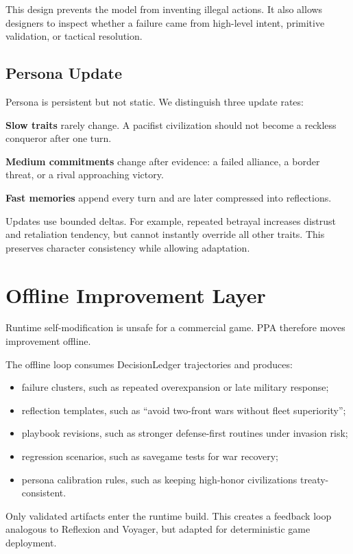 \documentclass[10pt,twocolumn]{article}
\begin{document}
This design prevents the model from inventing illegal actions. It also allows designers to inspect whether a failure came from high-level intent, primitive validation, or tactical resolution.

\subsection{Persona Update}
Persona is persistent but not static. We distinguish three update rates:

\textbf{Slow traits} rarely change. A pacifist civilization should not become a reckless conqueror after one turn.

\textbf{Medium commitments} change after evidence: a failed alliance, a border threat, or a rival approaching victory.

\textbf{Fast memories} append every turn and are later compressed into reflections.

Updates use bounded deltas. For example, repeated betrayal increases distrust and retaliation tendency, but cannot instantly override all other traits. This preserves character consistency while allowing adaptation.

\section{Offline Improvement Layer}
Runtime self-modification is unsafe for a commercial game. PPA therefore moves improvement offline.

The offline loop consumes DecisionLedger trajectories and produces:
\begin{itemize}
  \item failure clusters, such as repeated overexpansion or late military response;
  \item reflection templates, such as ``avoid two-front wars without fleet superiority'';
  \item playbook revisions, such as stronger defense-first routines under invasion risk;
  \item regression scenarios, such as savegame tests for war recovery;
  \item persona calibration rules, such as keeping high-honor civilizations treaty-consistent.
\end{itemize}

Only validated artifacts enter the runtime build. This creates a feedback loop analogous to Reflexion and Voyager, but adapted for deterministic game deployment.
\end{document}
